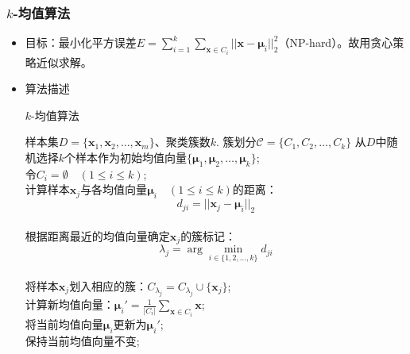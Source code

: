 \documentclass{ctexart}
\begin{document}
					\subsubsection{$k$-均值算法}
						\begin{itemize}
							\item 目标：最小化平方误差$E=\sum_{i=1}^{k}\sum_{\bm{x}\in C_i}^{}||\bm{x}-\bm{\mu}_i||_2^2$（NP-hard）。故用贪心策略近似求解。
							\item 算法描述\begin{algorithm}
								\caption{$k$-均值算法}
								\begin{algorithmic}[1]
									\REQUIRE 样本集$D=\{\bm{x}_1,\bm{x}_2,\dots,\bm{x}_m\}$、聚类簇数$k$.
									\ENSURE 簇划分$\mathcal{C}=\{C_1,C_2,\dots,C_k\}$
									\STATE 从$D$中随机选择$k$个样本作为初始均值向量$\{\bm{\mu}_1,\bm{\mu}_2,\dots,\bm{\mu}_k\}$; \\
									\REPEAT
									\STATE 令$C_i=\emptyset\quad(1\le i\le k)$; \\
										\STATE 计算样本$\bm{x}_j$与各均值向量$\bm{\mu}_i\quad(1\le i\le k)$的距离：\[d_{ji}=||\bm{x}_j-\bm{\mu}_i||_2\] \\
										\STATE 根据距离最近的均值向量确定$\bm{x}_j$的簇标记：\[\lambda_j=\arg\min_{i\in\{1,2,\dots,k\}}d_{ji}\] \\
										\STATE 将样本$\bm{x}_j$划入相应的簇：$C_{\lambda_j}=C_{\lambda_j}\cup\{\bm{x}_j\}$; \\
									\ENDFOR
										\STATE 计算新均值向量：$\bm{\mu}_i'=\frac{1}{|C_i|}\sum_{\bm{x}\in C_i}^{}\bm{x}$; \\
											\STATE 将当前均值向量$\bm{\mu}_i$更新为$\bm{\mu}_i'$; \\
										\ELSE
											\STATE 保持当前均值向量不变; \\
										\ENDIF
									\ENDFOR
								\end{algorithmic} 
							\end{algorithm}
						\end{itemize}
\end{document}
